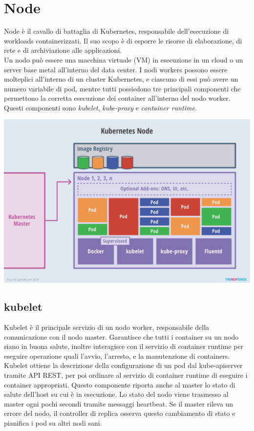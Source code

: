 \documentclass[12pt, a4paper]{report}
\begin{document}
\section{Node}
Node  è il cavallo di battaglia di Kubernetes, responsabile dell'esecuzione di workloads containerizzati. Il suo scopo è di esporre le risorse di elaborazione, di rete e di archiviazione alle applicazioni.\\
Un nodo può essere una macchina virtuale (VM) in esecuzione in un cloud o un server base metal all'interno del data center.
I nodi workers possono essere molteplici all'interno di un cluster Kubernetes, e ciascuno di essi può avere un numero variabile di pod, mentre tutti possiedono tre principali componenti che permettono la corretta esecuzione dei container all'interno del nodo worker. Questi componenti sono \textit{kubelet}, \textit{kube-proxy} e \textit{container runtime}.
\begin{center}
  \includegraphics[scale=0.47]{Images/Kubernetes-workers}
\end{center}
\subsection{kubelet}
Kubelet è il principale servizio di un nodo worker, responsabile della comunicazione con il nodo master. Garantisce che tutti i container su un nodo siano in buona salute, inoltre interagisce con il servizio di container runtime per eseguire operazione quali l'avvio, l'arresto, e la manutenzione di containers. Kubelet ottiene la descrizione della configurazione di un pod dal kube-apiserver tramite API REST, per poi ordinare al servizio di container runtime di eseguire i container appropriati. Questo componente riporta anche al master lo stato di salute dell'host su cui è in esecuzione. Lo stato del nodo viene trasmesso al master ogni pochi secondi tramite messaggi heartbeat. Se il master rileva un errore del nodo, il controller di replica osserva questo cambiamento di stato e pianifica i pod su altri nodi sani.
\end{document}
